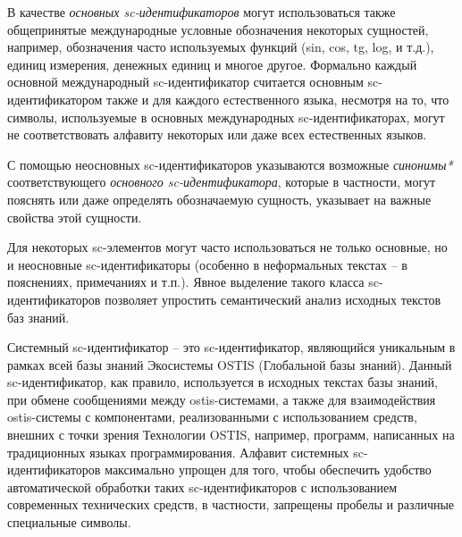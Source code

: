 В качестве \textit{основных sc-идентификаторов} могут использоваться также общепринятые международные условные обозначения некоторых сущностей, например, обозначения часто используемых функций (sin, cos, tg, log, и т.д.), единиц измерения, денежных единиц и многое другое. Формально каждый основной международный sc-идентификатор считается основным sc-идентификатором также и для каждого естественного языка, несмотря на то, что символы, используемые в основных международных sc-идентификаторах, могут не соответствовать алфавиту некоторых или даже всех естественных языков.

С помощью неосновных sc-идентификаторов указываются возможные \textit{синонимы*} соответствующего \textit{основного sc-идентификатора}, которые в частности, могут пояснять или даже определять обозначаемую сущность, указывает на важные свойства этой сущности.

Для некоторых sc-элементов могут часто использоваться не только основные, но и неосновные sc-идентификаторы (особенно в неформальных текстах -- в пояснениях, примечаниях и т.п.). Явное выделение такого класса sc-идентификаторов позволяет упростить семантический анализ исходных текстов баз знаний.


Системный sc-идентификатор -- это sc-идентификатор, являющийся уникальным в рамках всей базы знаний Экосистемы OSTIS (Глобальной базы знаний). Данный sc-идентификатор,
как правило, используется в исходных текстах базы знаний, при обмене сообщениями между ostis-системами, а также для взаимодействия ostis-системы с компонентами, реализованными с использованием средств, внешних с точки зрения Технологии OSTIS, например, программ, написанных на традиционных языках программирования. Алфавит системных sc-идентификаторов максимально упрощен для того, чтобы обеспечить удобство автоматической обработки таких sc-идентификаторов с использованием современных технических
средств, в частности, запрещены пробелы и различные специальные символы.


